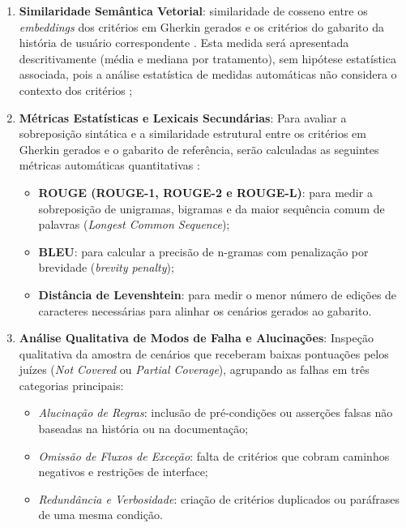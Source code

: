 \begin{enumerate}
    \item \textbf{Similaridade Semântica Vetorial}: similaridade de cosseno entre os \textit{embeddings} dos critérios em Gherkin gerados e os critérios do gabarito da história de usuário correspondente \cite{wang2025}. Esta medida será apresentada descritivamente (média e mediana por tratamento), sem hipótese estatística associada, pois a análise estatística de medidas automáticas não considera o contexto dos critérios \cite{wang2025};

    \item \textbf{Métricas Estatísticas e Lexicais Secundárias}: Para avaliar a sobreposição sintática e a similaridade estrutural entre os critérios em Gherkin gerados e o gabarito de referência, serão calculadas as seguintes métricas automáticas quantitativas \cite{wang2025}:
    \begin{itemize}
        \item \textbf{ROUGE (ROUGE-1, ROUGE-2 e ROUGE-L)}: para medir a sobreposição de unigramas, bigramas e da maior sequência comum de palavras (\textit{Longest Common Sequence});
        \item \textbf{BLEU}: para calcular a precisão de n-gramas com penalização por brevidade (\textit{brevity penalty});
        \item \textbf{Distância de Levenshtein}: para medir o menor número de edições de caracteres necessárias para alinhar os cenários gerados ao gabarito.
    \end{itemize}

    \item \textbf{Análise Qualitativa de Modos de Falha e Alucinações}: Inspeção qualitativa da amostra de cenários que receberam baixas pontuações pelos juízes (\textit{Not Covered} ou \textit{Partial Coverage}), agrupando as falhas em três categorias principais:
    \begin{itemize}
        \item \textit{Alucinação de Regras}: inclusão de pré-condições ou asserções falsas não baseadas na história ou na documentação;
        \item \textit{Omissão de Fluxos de Exceção}: falta de critérios que cobram caminhos negativos e restrições de interface;
        \item \textit{Redundância e Verbosidade}: criação de critérios duplicados ou paráfrases de uma mesma condição.
    \end{itemize}
\end{enumerate}